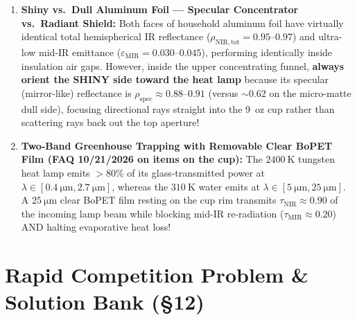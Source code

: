\begin{devicebox}
\begin{enumerate}
  \item \textbf{Shiny vs.\ Dull Aluminum Foil — Specular Concentrator vs.\ Radiant Shield:} Both faces of household aluminum foil have virtually identical total hemispherical IR reflectance ($\rho_{\mathrm{NIR,tot}} = 0.95\text{--}0.97$) and ultra-low mid-IR emittance ($\varepsilon_{\mathrm{MIR}} = 0.030\text{--}0.045$), performing identically inside insulation air gaps. However, inside the upper concentrating funnel, \textbf{always orient the SHINY side toward the heat lamp} because its specular (mirror-like) reflectance is $\rho_{\mathrm{spec}} \approx 0.88\text{--}0.91$ (versus $\sim 0.62$ on the micro-matte dull side), focusing directional rays straight into the 9~oz cup rather than scattering rays back out the top aperture!
  \item \textbf{Two-Band Greenhouse Trapping with Removable Clear BoPET Film (FAQ 10/21/2026 on items on the cup):} The $\SI{2400}{\kelvin}$ tungsten heat lamp emits $>80\%$ of its glass-transmitted power at $\lambda \in [\SI{0.4}{\micro\meter}, \SI{2.7}{\micro\meter}]$, whereas the $\SI{310}{\kelvin}$ water emits at $\lambda \in [\SI{5}{\micro\meter}, \SI{25}{\micro\meter}]$. A $\SI{25}{\micro\meter}$ clear BoPET film resting on the cup rim transmits $\tau_{\mathrm{NIR}} \approx 0.90$ of the incoming lamp beam while blocking mid-IR re-radiation ($\tau_{\mathrm{MIR}} \approx 0.20$) AND halting evaporative heat loss!
\end{enumerate}
\end{devicebox}

\section{Rapid Competition Problem \& Solution Bank (§12)}
\label{sec:12.5}

